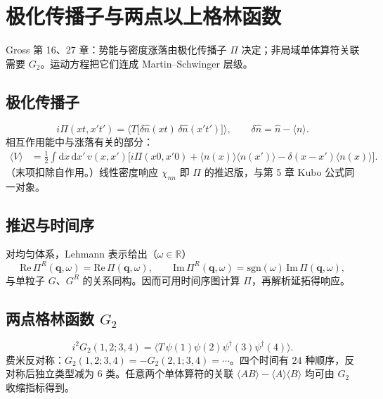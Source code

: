 \section{极化传播子与两点以上格林函数}

Gross 第 16、27 章：势能与密度涨落由极化传播子 $\Pi$ 决定；非局域单体算符关联需要 $G_2$。运动方程把它们连成 Martin--Schwinger 层级。

\subsection{极化传播子}

\begin{equation}
  i\Pi(xt,x't')
  =\bigl\langle
  T\bigl[\delta\hat n(xt)\,\delta\hat n(x't')\bigr]
  \bigr\rangle,
  \qquad
  \delta\hat n=\hat n-\langle n\rangle.
\label{eq:Pi_def}
\end{equation}
相互作用能中与涨落有关的部分：
\begin{equation}
\begin{aligned}
  \langle V\rangle
  &=\frac12\int\mathrm{d}x\,\mathrm{d}x'\,
  v(x,x')
  \bigl[
  i\Pi(x0,x'0)
  +\langle n(x)\rangle\langle n(x')\rangle
  -\delta(x-x')\langle n(x)\rangle
  \bigr].
\end{aligned}
\end{equation}
（末项扣除自作用。）线性密度响应 $\chi_{nn}$ 即 $\Pi$ 的推迟版，与第 5 章 Kubo 公式同一对象。

\subsection{推迟与时间序}

对均匀体系，Lehmann 表示给出（$\omega\in\mathbb{R}$）
\begin{equation}
  \mathrm{Re}\,\Pi^R(\mathbf{q},\omega)
  =\mathrm{Re}\,\Pi(\mathbf{q},\omega),
  \qquad
  \mathrm{Im}\,\Pi^R(\mathbf{q},\omega)
  =\mathrm{sgn}(\omega)\,\mathrm{Im}\,\Pi(\mathbf{q},\omega),
\end{equation}
与单粒子 $G$、$G^R$ 的关系同构。因而可用时间序图计算 $\Pi$，再解析延拓得响应。

\subsection{两点格林函数 $G_2$}

\begin{equation}
  i^2 G_2(1,2;3,4)
  =\bigl\langle
  T\,\psi(1)\psi(2)\psi^\dagger(3)\psi^\dagger(4)
  \bigr\rangle.
\label{eq:G2}
\end{equation}
费米反对称：$G_2(1,2;3,4)=-G_2(2,1;3,4)=\cdots$。四个时间有 $24$ 种顺序，反对称后独立类型减为 $6$ 类。任意两个单体算符的关联 $\langle AB\rangle-\langle A\rangle\langle B\rangle$ 均可由 $G_2$ 收缩指标得到。

